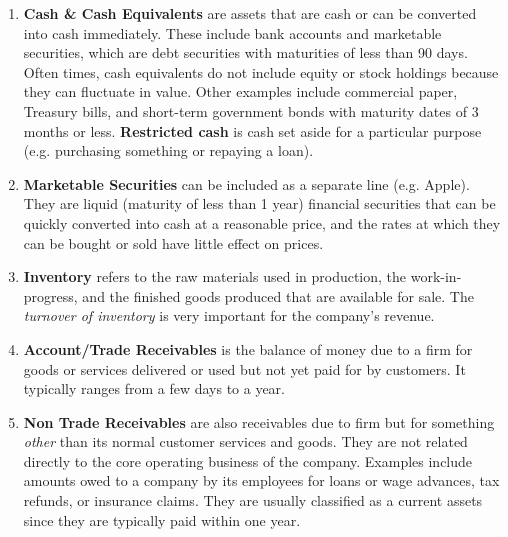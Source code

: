 \documentclass{article}
\begin{document}
    \begin{definition}
      \label{def:current-assets}
      \begin{enumerate}
        \item \textbf{Cash \& Cash Equivalents} are assets that are cash or can be converted into cash immediately. These include bank accounts and marketable securities, which are debt securities with maturities of less than 90 days. Often times, cash equivalents do not include equity or stock holdings because they can fluctuate in value. Other examples include commercial paper, Treasury bills, and short-term government bonds with maturity dates of 3 months or less. \textbf{Restricted cash} is cash set aside for a particular purpose (e.g. purchasing something or repaying a loan).
        \item \textbf{Marketable Securities} can be included as a separate line (e.g. Apple). They are liquid (maturity of less than 1 year) financial securities that can be quickly converted into cash at a reasonable price, and the rates at which they can be bought or sold have little effect on prices.
        \item \textbf{Inventory} refers to the raw materials used in production, the work-in-progress, and the finished goods produced that are available for sale. The \textit{turnover of inventory} is very important for the company's revenue.
        \item \textbf{Account/Trade Receivables} is the balance of money due to a firm for goods or services delivered or used but not yet paid for by customers. It typically ranges from a few days to a year.
        \item \textbf{Non Trade Receivables} are also receivables due to firm but for something \textit{other} than its normal customer services and goods. They are not related directly to the core operating business of the company. Examples include amounts owed to a company by its employees for loans or wage advances, tax refunds, or insurance claims. They are usually classified as a current assets since they are typically paid within one year.


\end{enumerate}
\end{definition}
\end{document}
